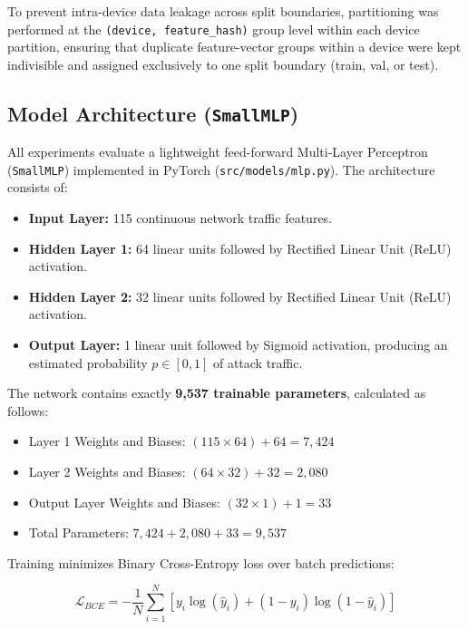 \documentclass[11pt,a4paper]{article}
\begin{document}
To prevent intra-device data leakage across split boundaries, partitioning was performed at the \texttt{(device, feature\_hash)} group level within each device partition, ensuring that duplicate feature-vector groups within a device were kept indivisible and assigned exclusively to one split boundary (train, val, or test).

\subsection{Model Architecture (\texttt{SmallMLP})}
All experiments evaluate a lightweight feed-forward Multi-Layer Perceptron (\texttt{SmallMLP}) implemented in PyTorch (\texttt{src/models/mlp.py}). The architecture consists of:

\begin{itemize}
    \item \textbf{Input Layer:} 115 continuous network traffic features.
    \item \textbf{Hidden Layer 1:} 64 linear units followed by Rectified Linear Unit (ReLU) activation.
    \item \textbf{Hidden Layer 2:} 32 linear units followed by Rectified Linear Unit (ReLU) activation.
    \item \textbf{Output Layer:} 1 linear unit followed by Sigmoid activation, producing an estimated probability $p \in [0, 1]$ of attack traffic.
\end{itemize}

The network contains exactly \textbf{9,537 trainable parameters}, calculated as follows:

\begin{itemize}
    \item Layer 1 Weights and Biases: $(115 \times 64) + 64 = 7,424$
    \item Layer 2 Weights and Biases: $(64 \times 32) + 32 = 2,080$
    \item Output Layer Weights and Biases: $(32 \times 1) + 1 = 33$
    \item Total Parameters: $7,424 + 2,080 + 33 = 9,537$
\end{itemize}

Training minimizes Binary Cross-Entropy loss over batch predictions:

\begin{equation}
    \mathcal{L}_{BCE} = -\frac{1}{N} \sum_{i=1}^N \left[ y_i \log(\hat{y}_i) + (1 - y_i) \log(1 - \hat{y}_i) \right]
\end{equation}
\end{document}
